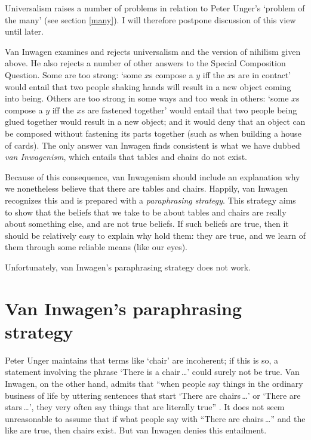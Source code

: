 \documentclass[11pt]{standalone}
\begin{document}
\begin{spacing}{1.5}
Universalism raises a number of problems in relation to Peter Unger's
`problem of the many' (see section \ref{many}).  I will therefore
postpone discussion of this view until later.

Van Inwagen examines and rejects universalism and the version of
nihilism given above.  He also rejects a number of other answers to
the Special Composition Question.  Some are too strong: `some $x$s
compose a $y$ iff the $x$s are in contact' would entail that two
people shaking hands will result in a new object coming into being.
Others are too strong in some ways and too weak in others: `some $x$s
compose a $y$ iff the $x$s are fastened together' would entail that
two people being glued together would result in a new object; and it
would deny that an object can be composed without fastening its parts
together (such as when building a house of cards).  The only answer
van Inwagen finds consistent is what we have dubbed {\em van
  Inwagenism}, which entails that tables and chairs do not exist.

Because of this consequence, van Inwagenism should include an
explanation why we nonetheless believe that there are tables and
chairs.  Happily, van Inwagen recognizes this and is prepared with a
{\em paraphrasing strategy}.  This strategy aims to show that the
beliefs that we take to be about tables and chairs are really about
something else, and are not true beliefs.  If such beliefs are true,
then it should be relatively easy to explain why hold them: they are
true, and we learn of them through some reliable means (like our
eyes).

Unfortunately, van Inwagen's paraphrasing strategy does not work.

\section{Van Inwagen's paraphrasing strategy}
\label{inwagen}
Peter Unger maintains that terms like `chair' are incoherent; if this
is so, a statement involving the phrase `There is a chair\,\ldots '
could surely not be true.  Van Inwagen, on the other hand, admits that
``when people say things in the ordinary business of life by uttering
sentences that start `There are chairs\,\ldots ' or `There are
stars\,\ldots ', they very often say things that are literally true''
\cite[102]{inwagen1995}.  It does not seem unreasonable to assume that
if what people say with ``There are chairs\,\ldots '' and the like are
true, then chairs exist.  But van Inwagen denies this entailment.


\end{spacing}
\end{document}
